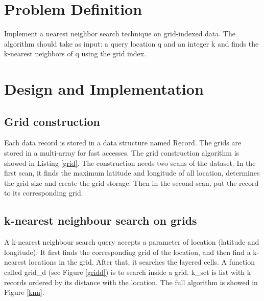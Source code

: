 \documentclass{article}
\def\v#1{{\fontfamily{cmtt}\selectfont #1}}
\begin{document}
\section{Problem Definition}
Implement a nearest neighbor search technique on grid-indexed data.
The algorithm should take as input: a query location q and an integer k and
finds the k-nearest neighbors of q using the grid index.

\section{Design and Implementation}
\subsection{Grid construction}
Each data record is stored in a data structure named \v{Record}. The grids
are stored in a multi-array for fast accesses. The grid construction algorithm
is showed in Listing \ref{grid}. The construction needs two scans of the dataset.
In the first scan, it finds the maximum latitude and longitude of all location,
determines the grid size and create the grid storage.
Then in the second scan, put the record to its corresponding grid.

\subsection{k-nearest neighbour search on grids}
A k-nearest neighbour search query accepts a parameter of
location (latitude and longitude). It first finds the corresponding
grid of the location, and then find a k-nearest locations in the grid.
After that, it searches the layered cells. A function called
\v{grid\_d} (see Figure \ref{gridd}) is to search inside a grid. \v{k\_set} is list with k
records ordered by its distance with the location. The full algorithm is showed in
Figure \ref{knn}.

\end{document}
